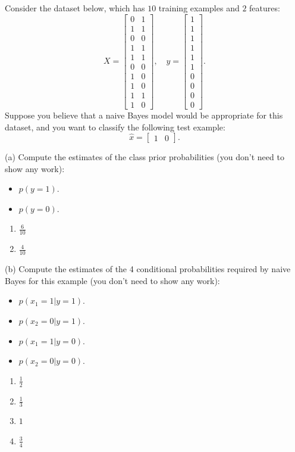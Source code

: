 \documentclass{article}
\def\blu#1{{\color{blu}#1}}
\def\items#1{\begin{itemize}#1\end{itemize}}
\begin{document}
Consider the dataset below, which has $10$ training examples and $2$ features:
\[
X = \begin{bmatrix}0 & 1\\1 & 1\\ 0 & 0\\ 1 & 1\\ 1 & 1\\ 0 & 0\\  1 & 0\\  1 & 0\\  1 & 1\\  1 &0\end{bmatrix}, \quad y = \begin{bmatrix}1\\1\\1\\1\\1\\1\\0\\0\\0\\0\end{bmatrix}.
\]
Suppose you believe that a naive Bayes model would be appropriate for this dataset, and you want to classify the following test example:
\[
\hat{x} = \begin{bmatrix}1 & 0\end{bmatrix}.
\]

\blu{(a) Compute the estimates of the class prior probabilities} (you don't need to show any work):
\items{
\item$ p(y = 1)$.
\item $p(y = 0)$.
}


\begin{enumerate}
\item  $\frac{6}{10}$
\item  $\frac{4}{10}$

\end{enumerate}

\blu{(b) Compute the estimates of the 4 conditional probabilities required by naive Bayes for this example}  (you don't need to show any work):
\items{
\item $p(x_1 = 1 | y = 1)$.
\item $p(x_2 = 0 | y = 1)$.
\item $p(x_1 = 1 | y = 0)$.
\item $p(x_2 = 0 | y = 0)$.
}

\begin{enumerate}
\item  $\frac{1}{2}$
\item  $\frac{1}{3}$
\item  $1$
\item  $\frac{3}{4}$

\end{enumerate}
\end{document}
